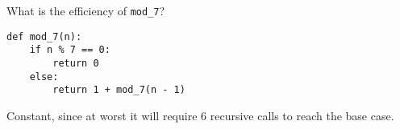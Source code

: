 \question
What is the efficiency of \texttt{mod\_7}?
\begin{lstlisting}
def mod_7(n):
    if n % 7 == 0:
        return 0
    else:
        return 1 + mod_7(n - 1)
\end{lstlisting}

\begin{solution}[0.0in]
    Constant, since at worst it will require 6 recursive calls to reach the
    base case.
\end{solution}